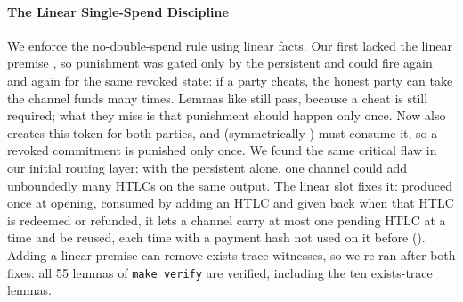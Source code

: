 \label{par:single-spend}%
\paragraph{The Linear Single-Spend Discipline}
We enforce the no-double-spend rule using linear facts. Our first
 lacked the linear premise , so punishment was gated only by the persistent
 and could fire again and again for the same revoked state: if a party
cheats, the honest party can take the channel funds many times. Lemmas like
 still pass, because a cheat is still required; what they
miss is that punishment should happen only once. Now  also creates this
token for both parties, and  (symmetrically
) must consume it, so a revoked commitment is punished only once. We
found the same critical flaw in our initial routing layer: with the persistent
 alone, one channel could add unboundedly many HTLCs on the same output.
The linear slot  fixes it: produced once at opening, consumed by adding an
HTLC and given back when that HTLC is redeemed or refunded, it lets a channel carry at most one
pending HTLC at a time and be reused, each time with a payment hash not used on it before
(). Adding a linear premise
can remove exists-trace witnesses, so we re-ran  after both
fixes: all 55 lemmas of \texttt{make verify} are verified, including the ten exists-trace lemmas.
